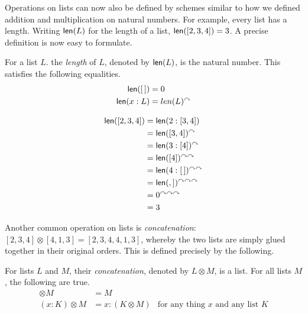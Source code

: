 Operations on lists can now also be defined by schemes similar to how 
we defined addition and multiplication on natural numbers. For example,
every list has a length. Writing $\mathord{\textsf{len}}(L)$ for the length of a list,
$\mathord{\textsf{len}}([2,3,4]) = 3$.  A precise definition is now easy to formulate.

\begin{defn}
  For a list $L$. the \emph{length} of $L$, denoted by $\mathord{\textsf{len}}(L)$, is
  the natural number. This satisfies the following equalities.
  \begin{align*}
    \mathord{\textsf{len}}([\,]) &= 0\\
    \mathord{\textsf{len}}(x:L) &= len(L)^\curvearrowright
  \end{align*}
\end{defn}

\begin{example}
  \begin{align*}
    \mathord{\textsf{len}}([2,3,4]) &= \mathord{\textsf{len}}(2:[3,4])\\
    &= \mathord{\textsf{len}}([3,4])^\curvearrowright\\
    &= \mathord{\textsf{len}}(3:[4])^\curvearrowright\\
    &= \mathord{\textsf{len}}([4])^{\curvearrowright\curvearrowright}\\
    &= \mathord{\textsf{len}}(4:[\,])^{\curvearrowright\curvearrowright}\\
    &= \mathord{\textsf{len}}(,])^{\curvearrowright\curvearrowright\curvearrowright}\\
    &= 0^{\curvearrowright\curvearrowright\curvearrowright}\\
    &= 3
  \end{align*}
\end{example}

\ipadbreak

Another common operation on lists is \emph{concatenation}:
$[2,3,4]\otimes[4,1,3] = [2,3,4,4,1,3]$, whereby the two lists are simply glued together in their original orders.  This is defined precisely by
the following.

\begin{defn}
  For lists $L$ and $M$, their \emph{concatenation}, denoted by
  $L\otimes M$, is a list. For all lists $M$, the following are true.
  \begin{align*}
    [\,]\otimes M &= M\\
    (x:K)\otimes M &= x:(K\otimes M) & \text{for any thing $x$ and any list $K$}
  \end{align*}
\end{defn}


